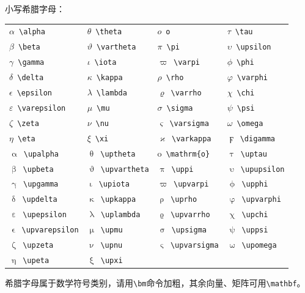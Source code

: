小写希腊字母：
\begin{table}[htbp]
\centering
\begin{tabular}{llll}
\toprule
$\alpha$~\verb|\alpha| & $\theta$~\verb|\theta| & $o$~\verb|o| & $\tau$~\verb|\tau| \\ 
$\beta$~\verb|\beta| & $\vartheta$~\verb|\vartheta| & $\pi$~\verb|\pi| & $\upsilon$~\verb|\upsilon| \\ 
$\gamma$~\verb|\gamma| & $\iota$~\verb|\iota| & $\varpi$~\verb|\varpi| & $\phi$~\verb|\phi| \\ 
$\delta$~\verb|\delta| & $\kappa$~\verb|\kappa| & $\rho$~\verb|\rho| & $\varphi$~\verb|\varphi| \\ 
$\epsilon$~\verb|\epsilon| & $\lambda$~\verb|\lambda| & $\varrho$~\verb|\varrho| & $\chi$~\verb|\chi| \\ 
$\varepsilon$~\verb|\varepsilon| & $\mu$~\verb|\mu| & $\sigma$~\verb|\sigma| & $\psi$~\verb|\psi| \\ 
$\zeta$~\verb|\zeta| & $\nu$~\verb|\nu| & $\varsigma$~\verb|\varsigma| & $\omega$~\verb|\omega| \\ 
$\eta$~\verb|\eta| & $\xi$~\verb|\xi| & $\varkappa$~\verb|\varkappa| & $\digamma$~\verb|\digamma| \\ 
\midrule
$\upalpha$~\verb|\upalpha| & $\uptheta$~\verb|\uptheta| & $\mathrm{o}$~\verb|\mathrm{o}| & $\uptau$~\verb|\uptau| \\ 
$\upbeta$~\verb|\upbeta| & $\upvartheta$~\verb|\upvartheta| & $\uppi$~\verb|\uppi| & $\upupsilon$~\verb|\upupsilon| \\ 
$\upgamma$~\verb|\upgamma| & $\upiota$~\verb|\upiota| & $\upvarpi$~\verb|\upvarpi| & $\upphi$~\verb|\upphi| \\ 
$\updelta$~\verb|\updelta| & $\upkappa$~\verb|\upkappa| & $\uprho$~\verb|\uprho| & $\upvarphi$~\verb|\upvarphi| \\ 
$\upepsilon$~\verb|\upepsilon| & $\uplambda$~\verb|\uplambda| & $\upvarrho$~\verb|\upvarrho| & $\upchi$~\verb|\upchi| \\ 
$\upvarepsilon$~\verb|\upvarepsilon| & $\upmu$~\verb|\upmu| & $\upsigma$~\verb|\upsigma| & $\uppsi$~\verb|\uppsi| \\ 
$\upzeta$~\verb|\upzeta| & $\upnu$~\verb|\upnu| & $\upvarsigma$~\verb|\upvarsigma| & $\upomega$~\verb|\upomega| \\ 
$\upeta$~\verb|\upeta| & $\upxi$~\verb|\upxi| & & \\ 
\bottomrule
\end{tabular}
\end{table}

希腊字母属于数学符号类别，请用\verb|\bm|命令加粗，其余向量、矩阵可用\verb|\mathbf|。
